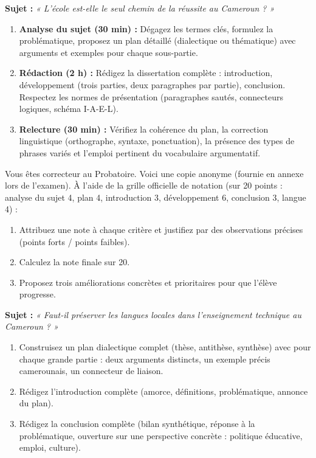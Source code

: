 \documentclass[11pt]{article}
\newcounter{popsec}
\newcounter{popsub}
\newcommand{\courssub}[1]{%
  \stepcounter{popsub}%
  \par\vspace{9pt}\noindent{\popxbold\fontsize{11.5}{13}\selectfont\color{popink}{\color{poporange}\thepopsec.\thepopsub}\hspace{6pt}#1}\par\nopagebreak\vspace{4pt}
}
\begin{document}
\courssub{Je me prépare au Bac}

\begin{exercice}
\textbf{Sujet :} \emph{« L'école est-elle le seul chemin de la réussite au Cameroun ? »}
\begin{enumerate}
\item \textbf{Analyse du sujet (30 min) :} Dégagez les termes clés, formulez la problématique, proposez un plan détaillé (dialectique ou thématique) avec arguments et exemples pour chaque sous-partie.
\item \textbf{Rédaction (2 h) :} Rédigez la dissertation complète : introduction, développement (trois parties, deux paragraphes par partie), conclusion. Respectez les normes de présentation (paragraphes sautés, connecteurs logiques, schéma I-A-E-L).
\item \textbf{Relecture (30 min) :} Vérifiez la cohérence du plan, la correction linguistique (orthographe, syntaxe, ponctuation), la présence des types de phrases variés et l'emploi pertinent du vocabulaire argumentatif.
\end{enumerate}
\end{exercice}

\begin{exercice}
Vous êtes correcteur au Probatoire. Voici une copie anonyme (fournie en annexe lors de l'examen). À l'aide de la grille officielle de notation (sur 20 points : analyse du sujet 4, plan 4, introduction 3, développement 6, conclusion 3, langue 4) :
\begin{enumerate}
\item Attribuez une note à chaque critère et justifiez par des observations précises (points forts / points faibles).
\item Calculez la note finale sur 20.
\item Proposez trois améliorations concrètes et prioritaires pour que l'élève progresse.
\end{enumerate}
\end{exercice}

\begin{exercice}
\textbf{Sujet :} \emph{« Faut-il préserver les langues locales dans l'enseignement technique au Cameroun ? »}
\begin{enumerate}
\item Construisez un plan dialectique complet (thèse, antithèse, synthèse) avec pour chaque grande partie : deux arguments distincts, un exemple précis camerounais, un connecteur de liaison.
\item Rédigez l'introduction complète (amorce, définitions, problématique, annonce du plan).
\item Rédigez la conclusion complète (bilan synthétique, réponse à la problématique, ouverture sur une perspective concrète : politique éducative, emploi, culture).
\end{enumerate}
\end{exercice}
\end{document}
